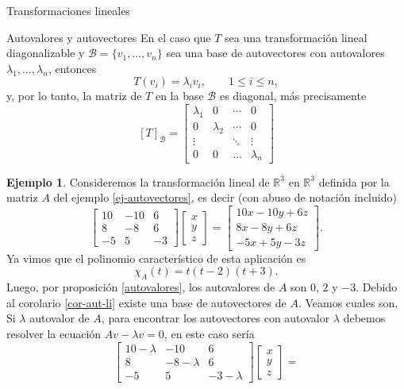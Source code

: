 \documentclass[a4paper,12pt,twoside,spanish,reqno]{amsbook}
\theoremstyle{definition}
\newtheorem{ejemplo}{Ejemplo}[section]
\theoremstyle{remark}
\newcommand{\R}{\mathbb R}
\begin{document}
\begin{chapter}{Transformaciones lineales}
\begin{section}{Autovalores y autovectores}
		En el caso que $T$ sea una transformación lineal diagonalizable y $\mathcal{B} = \{v_1,\ldots,v_n \}$ sea una base de autovectores con autovalores $\lambda_1,\ldots,\lambda_n$, entonces
		$$
		T(v_i) = \lambda_i v_i, \qquad 1 \le i \le n,
		$$ 
		y, por lo tanto, la matriz de $T$ en  la base $\mathcal{B}$ es diagonal, más precisamente
		$$
		[T]_\mathcal{B} = \begin{bmatrix}
		\lambda_1 &0 & \cdots & 0 \\
		0 & \lambda_2 & \cdots &0 \\
		\vdots & &\ddots & \vdots \\
		0 & 0 & \ldots &\lambda_n
		\end{bmatrix}
		$$
		
		\begin{ejemplo} Consideremos la transformación lineal de $\R^3$ en $\R^3$  definida por la matriz $A$ del ejemplo \ref{ej-autovectores},  es decir (con abuso de notación incluido)
			\begin{equation*}
				\begin{bmatrix}10&-10&6\\8& -8& 6\\-5& 5& -3\end{bmatrix}
				\begin{bmatrix} x\\y\\z \end{bmatrix} =
				\begin{bmatrix} 10x-10y+6z\\8x -8y +6z \\-5x+5y-3z\end{bmatrix}.
			\end{equation*}
		Ya vimos que  el  polinomio característico de esta aplicación es 
		$$
		\chi_A(t) = t (t-2)(t+3).
		$$
		Luego, por 	proposición \ref{autovalores}, los autovalores de $A$ son $0$, $2$ y $-3$. Debido al corolario \ref{cor-aut-li} existe una base de autovectores de $A$. Veamos cuales son. Si $\lambda$ autovalor de $A$, para encontrar los autovectores con autovalor $\lambda$  debemos resolver la ecuación $Av -\lambda v=0 $,  en este caso sería
		\begin{equation*}
		\begin{bmatrix}10- \lambda &-10&6\\8& -8- \lambda & 6\\-5& 5& -3- \lambda \end{bmatrix}
		\begin{bmatrix} x\\y\\z \end{bmatrix} =

\end{equation*}
\end{ejemplo}
\end{section}
\end{chapter}
\end{document}
